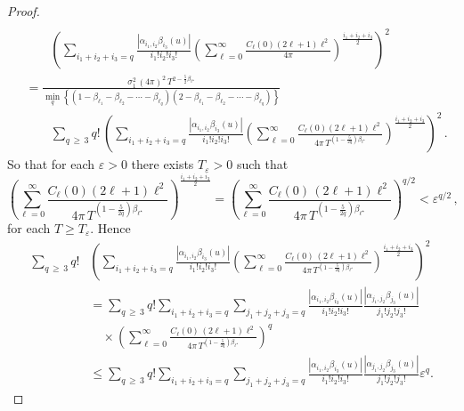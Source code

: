 \documentclass[10pt]{amsart}
\theoremstyle{definition}\newtheorem{defi}[theo]{Definition}\newtheorem{rema}[theo]{Remark}\newtheorem{exam}[theo]{Example}\newtheorem{exem}[theo]{Example}\newtheorem{nota}[theo]{Notation}
\begin{document}
\begin{proof}
\begin{align*}
\\
&\qquad \left(\sum_{i_{1}+i_{2}+i_{3}=q}\frac{\left|\alpha _{i_{1},i_{2}}\beta _{i_{3}}(u)\right|}{i_{1}!i_{2}!i_{3}!}\left(\sum_{\ell =0}^{\infty }\frac{C_\ell(0)(2\ell +1)\ell ^{2}}{4\pi}\right)^{\frac{i_{1}+i_{2}+i_{3}}{2}}\right) ^{2} \\
&=\frac{\sigma_{1}^{2}\,(4\pi)^{2}\,T^{2-\frac52\beta _{\ell^{\star }}}}{\min_{q}\left\{\left(1-\beta_{\ell _{1}}-\beta_{\ell_{2}}-\cdots -\beta_{\ell_{q}}\right)\left(2-\beta_{\ell_{1}}-\beta _{\ell_{2}}-\cdots -\beta_{\ell_{q}}\right)\right\}}
\\
&\qquad \sum_{q\,\geq\,3}q!\,\left(\sum_{i_{1}+i_{2}+i_{3}=q}\frac{\left|\alpha_{i_{1},i_{2}}\beta_{i_{3}}(u)\right|}{i_{1}!i_{2}!i_{3}!}\left(\sum_{\ell =0}^{\infty}\frac{C_\ell(0)(2\ell +1)\ell^{2}}{4\pi \, T^{\left(1-\frac5{2q}\right)\beta_{\ell^{\star}}}}\right)^{\frac{ i_{1}+i_{2}+i_{3}}{2}}\right)^{2}\,.
\end{align*}
\endgroup
So that for each $\varepsilon>0$ there exists $T_\varepsilon>0$ such that
\[
\left(\sum_{\ell =0}^{\infty }\frac{C_\ell(0)(2\ell +1)\ell ^{2}}{4\pi \, T^{\left(1-\frac5{2q}\right)\beta_{\ell^{\star}}}}\right)^{\frac{ i_{1}+i_{2}+i_{3}}{2}} =\left(\sum_{\ell =0}^{\infty }\frac{ C_\ell(0)\,(2\ell +1)\ell ^{2}}{4\pi \, T^{\left(1-\frac5{2q}\right)\beta_{\ell^{\star}}}}\right)^{q/2}<
\varepsilon^{q/2} \,,
\]
for each $T \ge T_\varepsilon$. Hence
\begingroup
\allowdisplaybreaks
\begin{align*}
\sum_{q\,\geq\,3}q! &\left(\sum_{i_{1}+i_{2}+i_{3}=q}\frac{\left|\alpha _{i_{1},i_{2}}\beta _{i_{3}}(u)\right|}{i_{1}!i_{2}!i_{3}!}\left(\sum_{\ell =0}^{\infty}\frac{C_\ell(0)\,(2\ell +1)\ell ^{2}}{4\pi \, T^{\left(1-\frac5{2q}\right)\beta_{\ell^{\star}}}}\right)^{\frac{ i_{1}+i_{2}+i_{3}}{2}}\right)^{2}
\\
&=\sum_{q\,\geq\,3}q!\sum_{i_{1}+i_{2}+i_{3}=q}\sum_{j_{1}+j_{2}+j_{3}=q}\frac{\left|\alpha _{i_{1},i_{2}}\beta _{i_{3}}(u)\right|}{i_{1}!i_{2}!i_{3}!}\frac{\left|\alpha _{j_{1},j_{2}}\beta _{j_{3}}(u)\right|}{j_{1}!j_{2}!j_{3}!}\\
&\quad\times\left(\sum_{\ell =0}^{\infty }\frac{C_\ell(0)\,(2\ell +1)\ell^{2}}{4\pi \, T^{\left(1-\frac5{2q}\right)\beta_{\ell^{\star}}}}\right)^{q}
\\
&\leq \sum_{q\,\geq\,3}q!\sum_{i_{1}+i_{2}+i_{3}=q}\sum_{j_{1}+j_{2}+j_{3}=q}
\frac{\left|\alpha _{i_{1},i_{2}}\beta _{i_{3}}(u)\right|}{i_{1}!i_{2}!i_{3}!}\frac{\left|\alpha _{j_{1},j_{2}}\beta _{j_{3}}(u)\right|}{j_{1}!j_{2}!j_{3}!}\varepsilon^{q}.
\end{align*}

\end{proof}
\end{document}
